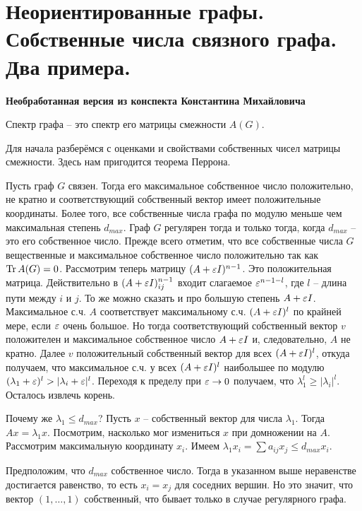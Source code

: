 \section{
 Неориентированные графы. Собственные числа связного графа. Два примера.
}

\textbf{Необработанная версия из конспекта Константина Михайловича}



\dfn Спектр графа -- это спектр его матрицы смежности $A(G)$.
\edfn


Для начала разберёмся с оценками и свойствами собственных чисел матрицы смежности. Здесь нам пригодится теорема Перрона. 


\lm Пусть граф $G$ связен. Тогда его максимальное собственное число положительно, не кратно и соответствующий собственный вектор имеет положительные координаты. Более того, все собственные числа графа по модулю меньше чем максимальная степень $d_{max}$. Граф $G$ регулярен тогда и только тогда, когда $d_{max}$ -- это его собственное число.
\elm
\proof Прежде всего отметим, что все собственные числа $G$ вещественные и максимальное собственное число положительно так как $\operatorname{Tr} A(G)=0$. Рассмотрим теперь матрицу $(A+\varepsilon I)^{n-1}$. Это положительная матрица. Действительно в $(A+\varepsilon I)^{n-1}_{ij}$ входит слагаемое $\varepsilon^{n-1-l}$, где $l$ -- длина пути между $i$ и $j$. То же можно сказать и про большую степень $A+\varepsilon I$. Максимальное с.ч. $A$ соответствует максимальному с.ч. $(A+\varepsilon I)^l$ по крайней мере, если $\varepsilon$ очень большое. Но тогда соответствующий собственный вектор $v$ положителен и максимальное собственное число $A+\varepsilon I$ и, следовательно, $A$ не кратно. Далее $v$ положительный собственный вектор для всех $(A+\varepsilon I)^{l}$, откуда получаем, что максимальное с.ч. у всех $(A+\varepsilon I)^{l}$ наибольшее по модулю $(\lambda_1+\varepsilon)^l>|\lambda_i+\varepsilon|^l$. Переходя к пределу при $\varepsilon \to 0$ получаем, что $\lambda_1^l \geq |\lambda_i|^l$. Осталось извлечь корень.

Почему же $\lambda_1 \leq d_{max}$? Пусть $x$ -- собственный вектор для числа $\lambda_1$. Тогда $Ax=\lambda_1 x$. Посмотрим, насколько мог измениться $x$ при домножении на $A$. Рассмотрим максимальную координату $x_i$. Имеем $\lambda_1 x_i= \sum a_{ij}x_j\leq d_{max} x_i$.

Предположим, что $d_{max}$ собственное число. Тогда в указанном выше неравенстве достигается равенство, то есть $x_i=x_j$ для соседних вершин. Но это значит, что вектор $(1,\dots,1)$ собственный, что бывает только в случае регулярного графа. 
\endproof


